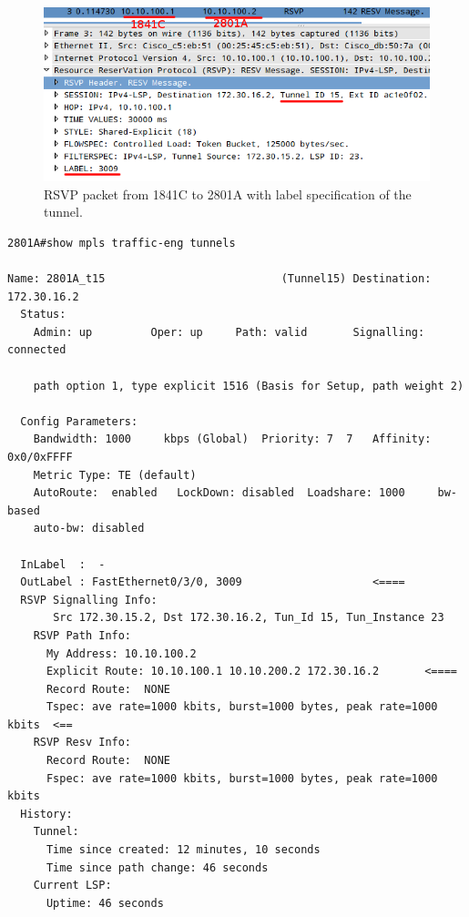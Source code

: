 \documentclass{llncs}
\begin{document}
\begin{figure}
\centering
\includegraphics[width=1.0\textwidth]{../e5/rsvp_message.png}
\caption{RSVP packet from 1841C to 2801A with label specification of the tunnel.}
\label{fig:mpls3_rsvp_message}
\end{figure}
\newpage
\lstset{language=sh, caption=2801A Traffic Engineering tunnels., basicstyle=\ttfamily\scriptsize , breaklines=true}
\begin{lstlisting}
2801A#show mpls traffic-eng tunnels 

Name: 2801A_t15                           (Tunnel15) Destination: 172.30.16.2
  Status:
    Admin: up         Oper: up     Path: valid       Signalling: connected

    path option 1, type explicit 1516 (Basis for Setup, path weight 2)

  Config Parameters:
    Bandwidth: 1000     kbps (Global)  Priority: 7  7   Affinity: 0x0/0xFFFF
    Metric Type: TE (default)
    AutoRoute:  enabled   LockDown: disabled  Loadshare: 1000     bw-based
    auto-bw: disabled

  InLabel  :  - 
  OutLabel : FastEthernet0/3/0, 3009					<====
  RSVP Signalling Info:
       Src 172.30.15.2, Dst 172.30.16.2, Tun_Id 15, Tun_Instance 23
    RSVP Path Info:
      My Address: 10.10.100.2   
      Explicit Route: 10.10.100.1 10.10.200.2 172.30.16.2 		<====
      Record Route:  NONE
      Tspec: ave rate=1000 kbits, burst=1000 bytes, peak rate=1000 kbits  <==
    RSVP Resv Info:
      Record Route:  NONE
      Fspec: ave rate=1000 kbits, burst=1000 bytes, peak rate=1000 kbits
  History:
    Tunnel:
      Time since created: 12 minutes, 10 seconds
      Time since path change: 46 seconds
    Current LSP:
      Uptime: 46 seconds
\end{lstlisting}
\newpage
\lstset{language=sh, caption=Forwarding table of 2801A after TE. Tunnel tagging is implicit., basicstyle=\ttfamily\scriptsize , breaklines=true}
\end{document}
